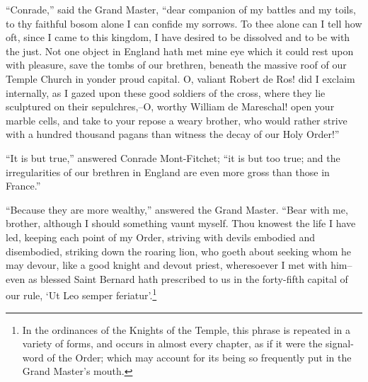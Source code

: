 ``Conrade,'' said the Grand Master, ``dear companion of my battles and
my toils, to thy faithful bosom alone I can confide my sorrows. To thee
alone can I tell how oft, since I came to this kingdom, I have desired
to be dissolved and to be with the just. Not one object in England hath
met mine eye which it could rest upon with pleasure, save the tombs of
our brethren, beneath the massive roof of our Temple Church in yonder
proud capital. O, valiant Robert de Ros! did I exclaim internally, as I
gazed upon these good soldiers of the cross, where they lie sculptured
on their sepulchres,--O, worthy William de Mareschal! open your marble
cells, and take to your repose a weary brother, who would rather strive
with a hundred thousand pagans than witness the decay of our Holy
Order!''

``It is but true,'' answered Conrade Mont-Fitchet; ``it is but too true;
and the irregularities of our brethren in England are even more gross
than those in France.''

``Because they are more wealthy,'' answered the Grand Master. ``Bear
with me, brother, although I should something vaunt myself. Thou knowest
the life I have led, keeping each point of my Order, striving with
devils embodied and disembodied, striking down the roaring lion, who
goeth about seeking whom he may devour, like a good knight and devout
priest, wheresoever I met with him--even as blessed Saint Bernard hath
prescribed to us in the forty-fifth capital of our rule, `Ut Leo semper
feriatur'.\footnote{In the ordinances of the Knights of the Temple, this
phrase is repeated in a variety of forms, and occurs in almost every
chapter, as if it were the signal-word of the Order; which may account
for its being so frequently put in the Grand Master's mouth.}

